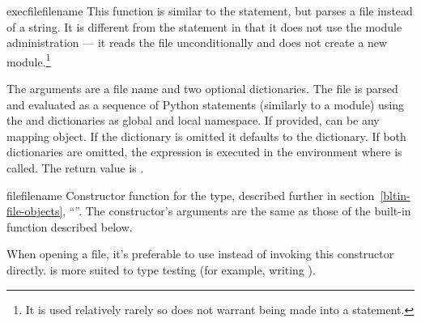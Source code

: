 \begin{funcdesc}{execfile}{filename}
  This function is similar to the
   statement, but parses a file instead of a string.  It
  is different from the  statement in that it does not
  use the module administration --- it reads the file unconditionally
  and does not create a new module.\footnote{It is used relatively
  rarely so does not warrant being made into a statement.}

  The arguments are a file name and two optional dictionaries.  The file is
  parsed and evaluated as a sequence of Python statements (similarly to a
  module) using the  and  dictionaries as global and
  local namespace. If provided,  can be any mapping object.
  If the  dictionary is omitted it defaults to the 
  dictionary. If both dictionaries are omitted, the expression is executed in
  the environment where  is called.  The return value is
  .

\end{funcdesc}

\begin{funcdesc}{file}{filename}
  Constructor function for the  type, described further 
  in section~\ref{bltin-file-objects}, ``''.  The constructor's arguments
  are the same as those of the  built-in function
  described below.

  When opening a file, it's preferable to use  instead of 
  invoking this constructor directly.   is more suited to
  type testing (for example, writing ).

\end{funcdesc}

